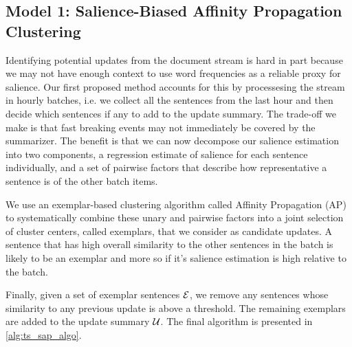 \subsection{Model 1: Salience-Biased Affinity Propagation Clustering}  
\label{sec:sapmodel}


  

  Identifying potential updates from the document stream is hard in part
  because we may not have enough context to use word frequencies as a 
  reliable proxy for salience. 
  Our first proposed method accounts for this
  by
  processesing the stream in hourly batches, i.e. we collect all the
  sentences from the last hour and then decide which sentences if any to
  add to the update summary. The trade-off we make is that fast breaking
  events may not immediately be covered by the summarizer. The benefit
  is that we can now decompose our salience estimation into two components,
  a regression estimate of salience for each sentence individually,
  and a set of pairwise factors that describe how representative a sentence 
  is of the other batch items. 


%   

  We use an exemplar-based clustering algorithm
  called Affinity Propagation (AP) \citep{frey2007clustering}
  to systematically combine these unary and pairwise factors into a joint 
  selection of cluster centers, called exemplars, that we consider as 
  candidate updates.
  A sentence that has high overall similarity to
  the other sentences in the batch is likely to be an exemplar and
  more so if it's salience estimation is high relative to the batch.



  
  
  Finally, given a set of exemplar sentences $\mathcal{E}$, we remove any
  sentences whose similarity to any previous update is above a threshold.
  The remaining exemplars are added to the update summary $\mathcal{U}$.
  The final algorithm is presented in \autoref{alg:ts_sap_algo}.



